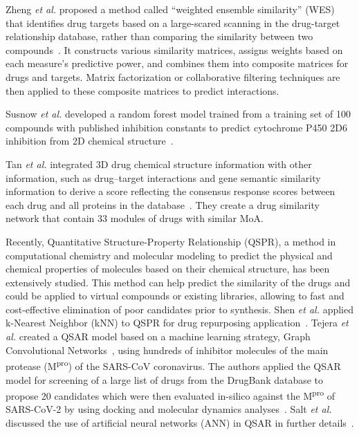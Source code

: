 Zheng \textit{et al.} proposed a method called ``weighted ensemble similarity'' (WES) that identifies drug targets based on a large-scared scanning in the drug-target relationship database, rather than comparing the similarity between two compounds~\cite{zheng2015large}.  It constructs various similarity matrices, assigns weights based on each measure’s predictive power, and combines them into composite matrices for drugs and targets. Matrix factorization or collaborative filtering techniques are then applied to these composite matrices to predict interactions. 

Susnow \textit{et al.} developed a random forest model trained from a training set of 100 compounds with published inhibition constants to predict cytochrome P450 2D6 inhibition from 2D chemical structure~\cite{susnow2003use}.

Tan \textit{et al.} integrated 3D drug chemical structure information with other information, such as drug–target interactions
and gene semantic similarity information to derive a score reflecting the consensus response scores between each drug and all proteins in the database~\cite{tan2014drug}. They create a drug similarity network that contain 33 modules of drugs with similar MoA.

Recently, Quantitative Structure-Property Relationship (QSPR), a method in computational chemistry and molecular modeling to predict the physical and chemical properties of molecules based on their chemical structure, has been extensively studied. This method can help predict the similarity of the drugs and could be applied to virtual compounds or
existing libraries, allowing to fast and cost-effective elimination of poor candidates prior to synthesis. Shen \textit{et al.} applied k-Nearest Neighbor (kNN) to QSPR for drug repurposing application~\cite{shen2003development}. Tejera \textit{et al.} created a QSAR model based on a machine learning strategy, Graph Convolutional Networks~\cite{duvenaud2015convolutional}, using hundreds of inhibitor molecules of the main protease (M\textsuperscript{pro}) of the SARS-CoV coronavirus. The authors applied the QSAR model for screening of a large list of drugs from the DrugBank database to propose 20 candidates which were then evaluated in-silico against the M\textsuperscript{pro} of SARS-CoV-2 by using docking and molecular dynamics analyses~\cite{tejera2020drugs}.
Salt \textit{et al.} discussed the use of artificial neural networks (ANN) in QSAR in further details~\cite{salt1992use}.




